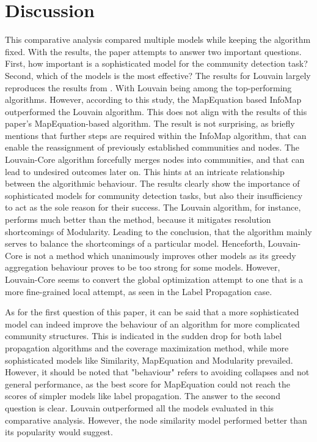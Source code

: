 \documentclass[11pt, twocolumn]{article}
\begin{document}
\section{Discussion}
\label{sec:discussion}
This comparative analysis compared multiple models while keeping the algorithm fixed. With the results, the paper attempts to answer two important questions. First, how important is a sophisticated model for the community detection task? Second, which of the models is the most effective?
The results for Louvain largely reproduces the results from \citeauthor{lancichinetti_CommunityDetectionAlgorithms_2009}. With Louvain being among the top-performing algorithms. However, according to this study, the MapEquation based InfoMap outperformed the Louvain algorithm. This does not align with the results of this paper's MapEquation-based algorithm. The result is not surprising, as \citeauthor{bohlin_CommunityDetectionVisualization_2014} briefly mentions that further steps are required within the InfoMap algorithm, that can enable the reassignment of previously established communities and nodes. The Louvain-Core algorithm forcefully merges nodes into communities, and that can lead to undesired outcomes later on. This hints at an intricate relationship between the algorithmic behaviour. The results clearly show the importance of sophisticated models for community detection tasks, but also their insufficiency to act as the sole reason for their success. The Louvain algorithm, for instance, performs much better than the \citeauthor{clauset_FindingCommunityStructure_2004} method, because it mitigates resolution shortcomings of Modularity. Leading to the conclusion, that the algorithm mainly serves to balance the shortcomings of a particular model. Henceforth, Louvain-Core is not a method which unanimously improves other models as its greedy aggregation behaviour proves to be too strong for some models. However, Louvain-Core seems to convert the global optimization attempt to one that is a more fine-grained local attempt, as seen in the Label Propagation case. 

As for the first question of this paper, it can be said that a more sophisticated model can indeed improve the behaviour of an algorithm for more complicated community structures. This is indicated in the sudden drop for both label propagation algorithms and the coverage maximization method, while more sophisticated models like Similarity, MapEquation and Modularity prevailed. However, it should be noted that "behaviour" refers to avoiding collapses and not general performance, as the best score for MapEquation could not reach the scores of simpler models like label propagation.  
The answer to the second question is clear. Louvain outperformed all the models evaluated in this comparative analysis. However, the node similarity model performed better than its popularity would suggest. 
\end{document}
